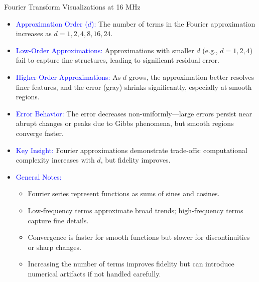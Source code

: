 \begin{frame}{Fourier Transform Visualizations at 16 MHz}
    \small
    \begin{itemize}
        \item \textcolor{blue}{Approximation Order (\(d\)):} 
              The number of terms in the Fourier approximation increases as \(d = 1, 2, 4, 8, 16, 24\).
        \item \textcolor{blue}{Low-Order Approximations:} 
              Approximations with smaller \(d\) (e.g., \(d = 1, 2, 4\)) fail to capture fine structures, leading to significant residual error.
        \item \textcolor{blue}{Higher-Order Approximations:} 
              As \(d\) grows, the approximation better resolves finer features, and the error (gray) shrinks significantly, especially at smooth regions.
        \item \textcolor{blue}{Error Behavior:} 
              The error decreases non-uniformly—large errors persist near abrupt changes or peaks due to Gibbs phenomena, but smooth regions converge faster.
        \item \textcolor{blue}{Key Insight:} 
              Fourier approximations demonstrate trade-offs: computational complexity increases with \(d\), but fidelity improves.
        \item \textcolor{blue}{General Notes:}
              \begin{itemize}
                  \item Fourier series represent functions as sums of sines and cosines.
                  \item Low-frequency terms approximate broad trends; high-frequency terms capture fine details.
                  \item Convergence is faster for smooth functions but slower for discontinuities or sharp changes.
                  \item Increasing the number of terms improves fidelity but can introduce numerical artifacts if not handled carefully.
              \end{itemize}
    \end{itemize}
\end{frame}


